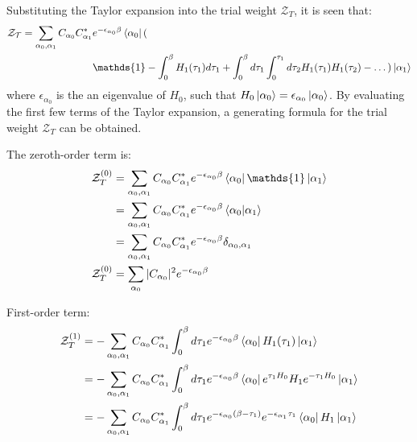 \documentclass[12pt, two sided]{article}
\begin{document}
Substituting the Taylor expansion into the trial weight $\mathcal{Z}_T$, it is seen that:
%
\begin{equation}
\begin{aligned}
\mathcal{Z_T} = \sum_{\alpha_0, \alpha_1} C_{\alpha_0} C_{\alpha_1}^{*} &e^{-\epsilon_{\alpha_0} \beta}  \bra{\alpha_0} ( \\
& \mathds{1} - \int_{0}^{\beta} H_1(\tau_1) d\tau_1 + \int_0^{\beta} d\tau_1 \int_{0}^{\tau_1} d\tau_2 H_1(\tau_1) H_1(\tau_2) - \dots ) \ket{\alpha_1}
\end{aligned}
\end{equation}
%
where $\epsilon_{\alpha_0}$ is the an eigenvalue of $H_0$, such that $H_0 \ket{\alpha_0} = \epsilon_{\alpha_0} \ket{\alpha_0}$.
By evaluating the first few terms of the Taylor expansion, a generating formula for the trial weight $\mathcal{Z}_T$ can be obtained. 

The zeroth-order term is:
\begin{equation}
\begin{aligned}
\mathcal{Z}_T^{(0)} &= \sum_{\alpha_0, \alpha_1} C_{\alpha_0} C_{\alpha_1}^{*} e^{-\epsilon_{\alpha_0} \beta}  \bra{\alpha_0} \mathds{1} \ket{\alpha_1} \\
&= \sum_{\alpha_0, \alpha_1} C_{\alpha_0} C_{\alpha_1}^{*} e^{-\epsilon_{\alpha_0} \beta}  \bra{\alpha_0} \ket{\alpha_1} \\
&= \sum_{\alpha_0, \alpha_1} C_{\alpha_0} C_{\alpha_1}^{*} e^{-\epsilon_{\alpha_0} \beta} \delta_{\alpha_0,\alpha_1} \\
\mathcal{Z}_T^{(0)}  &= \sum_{\alpha_0} \vert C_{\alpha_0} \vert^2 e^{-\epsilon_{\alpha_0} \beta}
\end{aligned}
\end{equation}

First-order term:
\begin{equation}
\begin{aligned}
\mathcal{Z}_T^{(1)} &= -\sum_{\alpha_0, \alpha_1} C_{\alpha_0} C_{\alpha_1}^{*}  \int_{0}^{\beta} d\tau_1 e^{-\epsilon_{\alpha_0} \beta} \bra{\alpha_0}  H_1(\tau_1) \ket{\alpha_1} \\
&= -\sum_{\alpha_0, \alpha_1} C_{\alpha_0} C_{\alpha_1}^{*}  \int_{0}^{\beta} d\tau_1 e^{-\epsilon_{\alpha_0} \beta} \bra{\alpha_0} e^{\tau_1 H_0}H_1e^{-\tau_1 H_0}  \ket{\alpha_1} \\
&= -\sum_{\alpha_0, \alpha_1} C_{\alpha_0} C_{\alpha_1}^{*}  \int_{0}^{\beta} d\tau_1 e^{-\epsilon_{\alpha_0}(\beta-\tau_1)} e^{-\epsilon_{\alpha_1} \tau_1}  \bra{\alpha_0} H_1 \ket{\alpha_1}
\end{aligned}
\end{equation}
\end{document}
